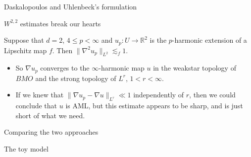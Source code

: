 \documentclass[10pt]{beamer}
\newcommand{\RR}{\mathbb{R}}
\begin{document}
\begin{frame}{Daskalopoulos and Uhlenbeck's formulation}
    
\end{frame}

\begin{frame}{$W^{2, 2}$ estimates break our hearts}
\begin{theorem} 
Suppose that $d = 2$, $4 \leq p < \infty$ and $u_p: U \to \RR^2$ is the $p$-harmonic extension of a Lipschitz map $f$.
Then $\|\nabla^2 u_p\|_{L^2} \lesssim_f 1$.
\end{theorem}
 
\begin{itemize}
\item So $\nabla u_p$ converges to the $\infty$-harmonic map $u$ in the weakstar topology of $BMO$ and the strong topology of $L^r$, $1 < r < \infty$.  
\item If we knew that $\|\nabla u_p - \nabla u\|_{L^r} \ll 1$ independently of $r$, then we could conclude that $u$ is AML, but this estimate appears to be sharp, and is just short of what we need.
\end{itemize}

\end{frame}

\begin{frame}{Comparing the two approaches}
    
\end{frame}

\begin{frame}{The toy model}

\end{frame}
\end{document}
